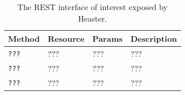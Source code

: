 \begin{table}
	\label{tbl:smart-elasticity-rest-cluster-monitor}
	\centering
	\begin{tabular}{| m{1.5cm} | m{3cm} | m{3cm} | m{8cm} | }\hline
		
		\textbf{Method} & \textbf{Resource} & \textbf{Params} & \textbf{Description} \\\hline
		
		\texttt{???}	& ???               & ???             & ??? \\\hline
		
		\texttt{???}	& ???               & ???             & ??? \\\hline
				
		\texttt{???}	& ???               & ???             & ??? \\\hline
		
	\end{tabular}
	\caption{The REST interface of interest exposed by Heaster.}
\end{table}